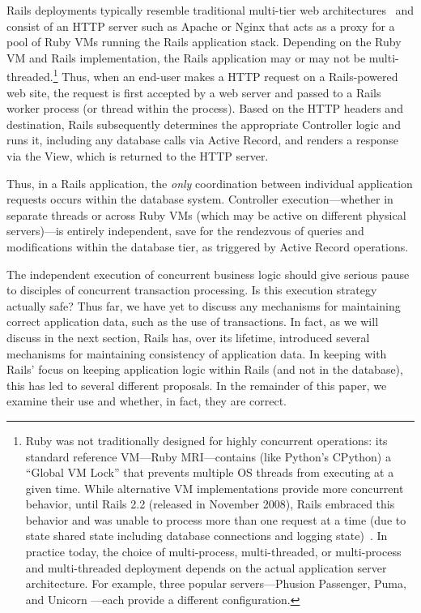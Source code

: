 Rails deployments typically resemble traditional multi-tier web architectures~\cite{alonso-web} and consist of an HTTP server such as Apache or Nginx that acts as a proxy for a pool of Ruby VMs running the Rails application stack. Depending on the Ruby VM and Rails implementation, the Rails application may or may not be multi-threaded.\footnote{Ruby was not traditionally designed for highly concurrent operations: its standard reference VM---Ruby MRI---contains (like Python's CPython) a ``Global VM Lock'' that prevents multiple OS threads from executing at a given time. While alternative VM implementations provide more concurrent behavior, until Rails 2.2 (released in November 2008), Rails embraced this behavior and was unable to process more than one request at a time (due to state shared state including database connections and logging state)~\cite{rails-threading}. In practice today, the choice of multi-process, multi-threaded, or multi-process and multi-threaded deployment depends on the actual application server architecture. For example, three popular servers---Phusion Passenger, Puma, and Unicorn ---each provide a different configuration.} Thus, when an end-user makes a HTTP request on a Rails-powered web site, the request is first accepted by a web server and passed to a Rails worker process (or thread within the process). Based on the HTTP headers and destination, Rails subsequently determines the appropriate Controller logic and runs it, including any database calls via Active Record, and renders a response via the View, which is returned to the HTTP server.

Thus, in a Rails application, the \textit{only} coordination between individual application requests occurs within the database system. Controller execution---whether in separate threads or across Ruby VMs (which may be active on different physical servers)---is entirely independent, save for the rendezvous of queries and modifications within the database tier, as triggered by Active Record operations.

The independent execution of concurrent business logic should give serious pause to disciples of concurrent transaction processing. Is this execution strategy actually safe? Thus far, we have yet to discuss any mechanisms for maintaining correct application data, such as the use of transactions. In fact, as we will discuss in the next section, Rails has, over its lifetime, introduced several mechanisms for maintaining consistency of application data. In keeping with Rails' focus on keeping application logic within Rails (and not in the database), this has led to several different proposals. In the remainder of this paper, we examine their use and whether, in fact, they are correct.



